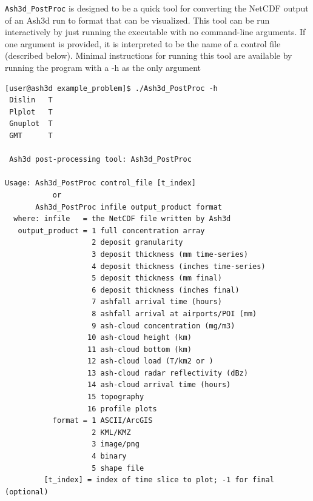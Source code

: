 \texttt{Ash3d\_PostProc} is designed to be a quick tool for converting the
NetCDF output of an Ash3d run to format that can be visualized. This tool
can be run interactively by just running the executable with no command-line
arguments. If one argument is provided, it is interpreted to be the name of a
control file (described below). Minimal instructions for running this tool
are available by running the program with a -h as the only argument
\small
\begin{verbatim}
[user@ash3d example_problem]$ ./Ash3d_PostProc -h
 Dislin   T
 Plplot   T
 Gnuplot  T
 GMT      T
                                                                                
 Ash3d post-processing tool: Ash3d_PostProc                                     
                                                                                
Usage: Ash3d_PostProc control_file [t_index]                                    
           or                                                                   
       Ash3d_PostProc infile output_product format                              
  where: infile   = the NetCDF file written by Ash3d                            
   output_product = 1 full concentration array                                  
                    2 deposit granularity                                       
                    3 deposit thickness (mm time-series)                        
                    4 deposit thickness (inches time-series)                    
                    5 deposit thickness (mm final)                              
                    6 deposit thickness (inches final)                          
                    7 ashfall arrival time (hours)                              
                    8 ashfall arrival at airports/POI (mm)                      
                    9 ash-cloud concentration (mg/m3)                           
                   10 ash-cloud height (km)                                     
                   11 ash-cloud bottom (km)                                     
                   12 ash-cloud load (T/km2 or )                                
                   13 ash-cloud radar reflectivity (dBz)                        
                   14 ash-cloud arrival time (hours)                            
                   15 topography                                                
                   16 profile plots                                             
           format = 1 ASCII/ArcGIS                                              
                    2 KML/KMZ                                                   
                    3 image/png                                                 
                    4 binary                                                    
                    5 shape file                                                
         [t_index] = index of time slice to plot; -1 for final (optional)
\end{verbatim}
